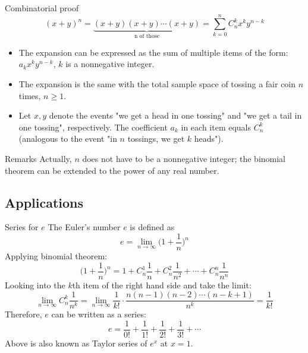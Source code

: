 \documentclass{beamer}
\begin{document}
\begin{frame}{Combinatorial proof}
$$(x+y)^n=\underbrace{(x+y)(x+y)\cdots(x+y)}_{\text{n of those}}=\sum_{k=0}^nC_n^kx^ky^{n-k}$$
\begin{itemize}
\item The expansion can be expressed as the sum of multiple items of the form: $a_kx^ky^{n-k}$, $k$ is a nonnegative integer.
\item The expansion is the same with the total sample space of tossing a fair coin $n$ times, $n \ge 1$.
\item Let $x,y$ denote the events "we get a head in one tossing" and "we get a tail in one tossing", respectively. The coefficient $a_k$ in each item equals $C_n^k$ (analogous to the event "in $n$ tossings, we get $k$ heads").
\end{itemize}
\begin{block}{Remarks}
Actually, $n$ does not have to be a nonnegative integer; the binomial theorem can be extended to the power of any real number. 
\end{block}
\end{frame}

\subsection{Applications}
\begin{frame}{Series for $e$}
The Euler's number $e$ is defined as
\begin{displaymath}
e=\lim_{n\to\infty}\bigg(1+\frac{1}{n}\bigg)^n
\end{displaymath}
Applying binomial theorem:
$$\bigg(1+\frac{1}{n}\bigg)^n=1+C_n^1\frac{1}{n}+C_n^2\frac{1}{n^2}+\cdots+C_n^n\frac{1}{n^n}$$
Looking into the $k$th item of the right hand side and take the limit:
$$\lim_{n\to\infty}C_n^k\frac{1}{n^k}=\lim_{n\to\infty}\frac{1}{k!}\cdot\frac{n(n-1)(n-2)\cdots(n-k+1)}{n^k}=\frac{1}{k!}$$
Therefore, $e$ can be written as a series:
$$e=\frac{1}{0!}+\frac{1}{1!}+\frac{1}{2!}+\frac{1}{3!}+\cdots$$
Above is also known as Taylor series of $e^x$ at $x=1$.
\end{frame}
\end{document}
